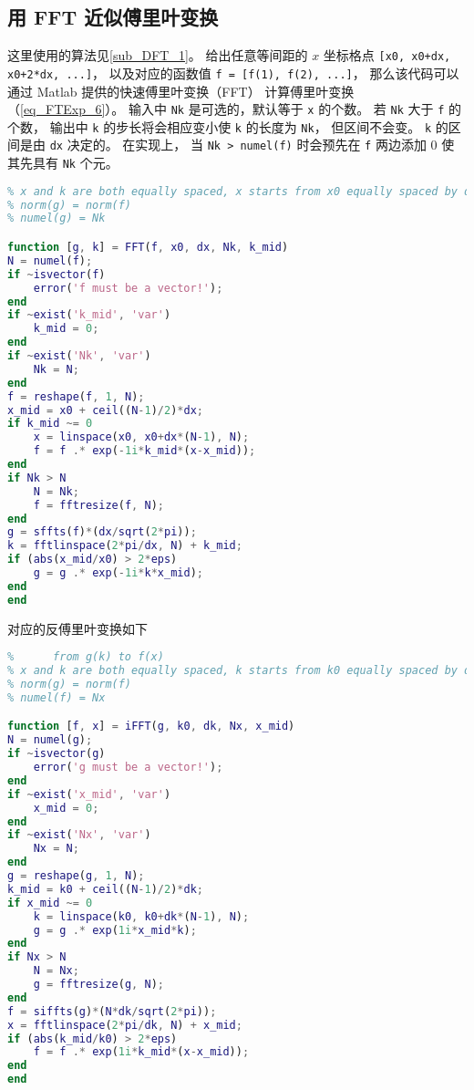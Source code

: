 \subsection{用 FFT 近似傅里叶变换}
这里使用的算法见\autoref{sub_DFT_1}。 给出任意等间距的 $x$ 坐标格点 \verb|[x0, x0+dx, x0+2*dx, ...]|， 以及对应的函数值 \verb|f = [f(1), f(2), ...]|， 那么该代码可以通过 Matlab 提供的快速傅里叶变换（FFT） 计算傅里叶变换（\autoref{eq_FTExp_6}）。 输入中 \verb|Nk| 是可选的，默认等于 \verb|x| 的个数。 若 \verb|Nk| 大于 \verb|f| 的个数， 输出中 \verb|k| 的步长将会相应变小使 \verb|k| 的长度为 \verb|Nk|， 但区间不会变。 \verb|k| 的区间是由 \verb|dx| 决定的。 在实现上， 当 \verb|Nk > numel(f)| 时会预先在 \verb|f| 两边添加 0 使其先具有 \verb|Nk| 个元。
\begin{lstlisting}[language=matlab, caption=FFT.m]
% fft approximation of the analytical fourier transform from f(x) to g(k)
% x and k are both equally spaced, x starts from x0 equally spaced by dx
% norm(g) = norm(f)
% numel(g) = Nk

function [g, k] = FFT(f, x0, dx, Nk, k_mid)
N = numel(f);
if ~isvector(f)
    error('f must be a vector!');
end
if ~exist('k_mid', 'var')
    k_mid = 0;
end
if ~exist('Nk', 'var')
    Nk = N;
end
f = reshape(f, 1, N);
x_mid = x0 + ceil((N-1)/2)*dx;
if k_mid ~= 0
    x = linspace(x0, x0+dx*(N-1), N);
    f = f .* exp(-1i*k_mid*(x-x_mid));
end
if Nk > N
    N = Nk;
    f = fftresize(f, N);
end
g = sffts(f)*(dx/sqrt(2*pi));
k = fftlinspace(2*pi/dx, N) + k_mid;
if (abs(x_mid/x0) > 2*eps)
    g = g .* exp(-1i*k*x_mid);
end
end
\end{lstlisting}
对应的反傅里叶变换如下
\begin{lstlisting}[language=matlab, caption=iFFT.m]
% ifft approximation of the analytical inverse Fourier transform
%      from g(k) to f(x)
% x and k are both equally spaced, k starts from k0 equally spaced by dk
% norm(g) = norm(f)
% numel(f) = Nx

function [f, x] = iFFT(g, k0, dk, Nx, x_mid)
N = numel(g);
if ~isvector(g)
    error('g must be a vector!');
end
if ~exist('x_mid', 'var')
    x_mid = 0;
end
if ~exist('Nx', 'var')
    Nx = N;
end
g = reshape(g, 1, N);
k_mid = k0 + ceil((N-1)/2)*dk;
if x_mid ~= 0
    k = linspace(k0, k0+dk*(N-1), N);
    g = g .* exp(1i*x_mid*k);
end
if Nx > N
    N = Nx;
    g = fftresize(g, N);
end
f = siffts(g)*(N*dk/sqrt(2*pi));
x = fftlinspace(2*pi/dk, N) + x_mid;
if (abs(k_mid/k0) > 2*eps)
    f = f .* exp(1i*k_mid*(x-x_mid));
end
end
\end{lstlisting}

